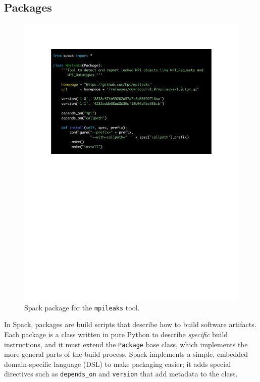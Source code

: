 
\subsection{Packages}

\begin{figure}
	\includegraphics[width=\columnwidth]{code/mpileaks.pdf}
	\caption{
		Spack package for the {\tt mpileaks} tool.
		\label{fig:mpileaks}
	}
\end{figure}

In Spack, packages are build scripts that describe how to build software
artifacts.  Each package is a class written in pure Python to describe
{\it specific} build instructions, and it must extend the {\tt Package}
base class, which implements the more general parts of the build process.
Spack implements a simple, embedded domain-specific language (DSL) to make
packaging easier; it adds special directives such as {\tt depends\_on} and
{\tt version} that add metadata to the class.

